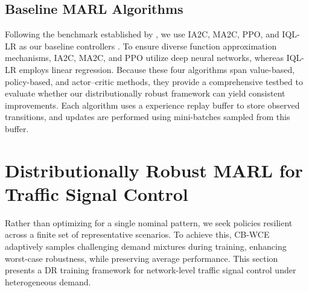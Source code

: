 \documentclass[lettersize,journal]{IEEEtran}
\begin{document}
\subsection{Baseline MARL Algorithms}
\label{subsec:baseline_algorithms}
Following the benchmark established by \cite{chu2019multi}, we use IA2C, MA2C, PPO, and IQL-LR as our baseline controllers \cite{chu2019multi,tan1993multi, schulman2017proximal}. To ensure diverse function approximation mechanisms, IA2C, MA2C, and PPO utilize deep neural networks, whereas IQL-LR employs linear regression. Because these four algorithms span value-based, policy-based, and actor--critic methods, they provide a comprehensive testbed to evaluate whether our distributionally robust framework can yield consistent improvements. Each algorithm uses a experience replay buffer to store observed transitions, and updates are performed using mini-batches sampled from this buffer. 

\section{Distributionally Robust MARL for Traffic Signal Control}
\label{sec:method}


Rather than optimizing for a single nominal pattern, we seek policies resilient across a finite set of representative scenarios. To achieve this, CB-WCE adaptively samples challenging demand mixtures during training, enhancing worst-case robustness, while preserving average performance. This section presents a DR training framework for network-level traffic signal control under heterogeneous demand.
\end{document}
